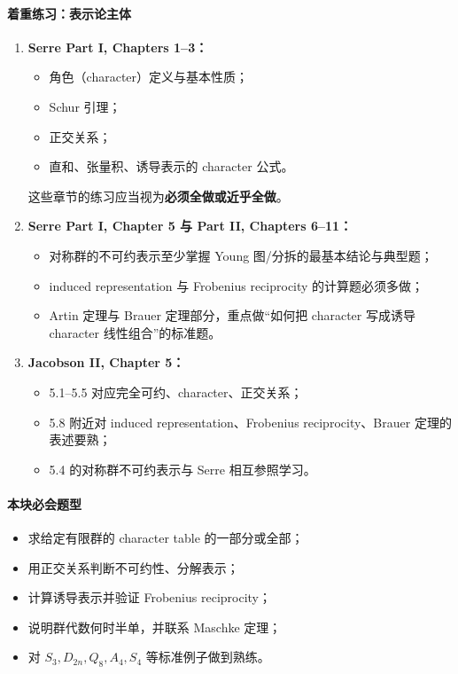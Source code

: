 \documentclass[12pt,a4paper]{ctexart}
\begin{document}
\paragraph{着重练习：表示论主体}
\begin{enumerate}
  \item \textbf{Serre Part I, Chapters 1--3：}
  \begin{itemize}
    \item 角色（character）定义与基本性质；
    \item Schur 引理；
    \item 正交关系；
    \item 直和、张量积、诱导表示的 character 公式。
  \end{itemize}
  这些章节的练习应当视为\textbf{必须全做或近乎全做}。

  \item \textbf{Serre Part I, Chapter 5 与 Part II, Chapters 6--11：}
  \begin{itemize}
    \item 对称群的不可约表示至少掌握 Young 图/分拆的最基本结论与典型题；
    \item induced representation 与 Frobenius reciprocity 的计算题必须多做；
    \item Artin 定理与 Brauer 定理部分，重点做“如何把 character 写成诱导 character 线性组合”的标准题。
  \end{itemize}

  \item \textbf{Jacobson II, Chapter 5：}
  \begin{itemize}
    \item 5.1--5.5 对应完全可约、character、正交关系；
    \item 5.8 附近对 induced representation、Frobenius reciprocity、Brauer 定理的表述要熟；
    \item 5.4 的对称群不可约表示与 Serre 相互参照学习。
  \end{itemize}
\end{enumerate}

\paragraph{本块必会题型}
\begin{itemize}
  \item 求给定有限群的 character table 的一部分或全部；
  \item 用正交关系判断不可约性、分解表示；
  \item 计算诱导表示并验证 Frobenius reciprocity；
  \item 说明群代数何时半单，并联系 Maschke 定理；
  \item 对 \(S_3, D_{2n}, Q_8, A_4, S_4\) 等标准例子做到熟练。
\end{itemize}
\end{document}
